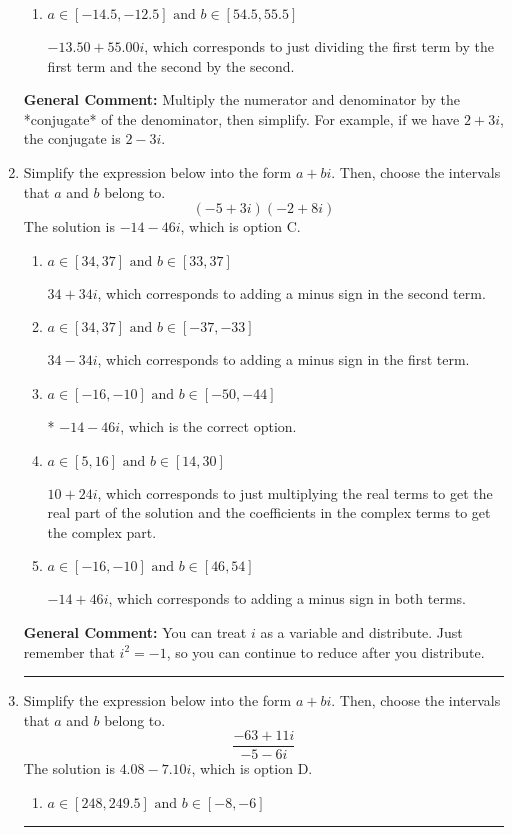 \documentclass{extbook}[14pt]
\newcommand{\litem}[1]{\item #1

\rule{\textwidth}{0.4pt}}
\begin{document}
\begin{enumerate}
{\begin{enumerate}[label=\Alph*.]
 $-9.47  - 274.00 i$, which corresponds to forgetting to multiply the conjugate by the numerator.
\item \( a \in [-14.5, -12.5] \text{ and } b \in [54.5, 55.5] \)

 $-13.50  + 55.00 i$, which corresponds to just dividing the first term by the first term and the second by the second.
\end{enumerate}

\textbf{General Comment:} Multiply the numerator and denominator by the *conjugate* of the denominator, then simplify. For example, if we have $2+3i$, the conjugate is $2-3i$.
}
\litem{
Simplify the expression below into the form $a+bi$. Then, choose the intervals that $a$ and $b$ belong to.
\[ (-5 + 3 i)(-2 + 8 i) \]The solution is \( -14 - 46 i \), which is option C.\begin{enumerate}[label=\Alph*.]
\item \( a \in [34, 37] \text{ and } b \in [33, 37] \)

 $34 + 34 i$, which corresponds to adding a minus sign in the second term.
\item \( a \in [34, 37] \text{ and } b \in [-37, -33] \)

 $34 - 34 i$, which corresponds to adding a minus sign in the first term.
\item \( a \in [-16, -10] \text{ and } b \in [-50, -44] \)

* $-14 - 46 i$, which is the correct option.
\item \( a \in [5, 16] \text{ and } b \in [14, 30] \)

 $10 + 24 i$, which corresponds to just multiplying the real terms to get the real part of the solution and the coefficients in the complex terms to get the complex part.
\item \( a \in [-16, -10] \text{ and } b \in [46, 54] \)

 $-14 + 46 i$, which corresponds to adding a minus sign in both terms.
\end{enumerate}

\textbf{General Comment:} You can treat $i$ as a variable and distribute. Just remember that $i^2=-1$, so you can continue to reduce after you distribute.
}
\litem{
Simplify the expression below into the form $a+bi$. Then, choose the intervals that $a$ and $b$ belong to.
\[ \frac{-63 + 11 i}{-5 - 6 i} \]The solution is \( 4.08  - 7.10 i \), which is option D.\begin{enumerate}[label=\Alph*.]
\item \( a \in [248, 249.5] \text{ and } b \in [-8, -6] \)


\end{enumerate}}
\end{enumerate}
\end{document}
